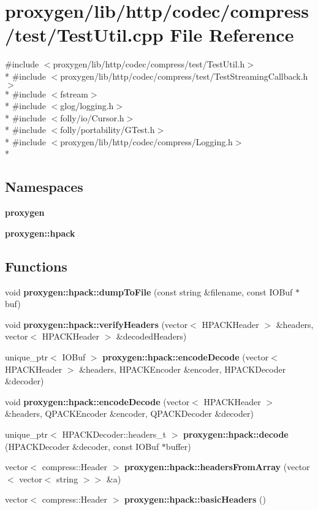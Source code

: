 \section{proxygen/lib/http/codec/compress/test/\+Test\+Util.cpp File Reference}
\label{TestUtil_8cpp}
{\ttfamily \#include $<$proxygen/lib/http/codec/compress/test/\+Test\+Util.\+h$>$}\\*
{\ttfamily \#include $<$proxygen/lib/http/codec/compress/test/\+Test\+Streaming\+Callback.\+h$>$}\\*
{\ttfamily \#include $<$fstream$>$}\\*
{\ttfamily \#include $<$glog/logging.\+h$>$}\\*
{\ttfamily \#include $<$folly/io/\+Cursor.\+h$>$}\\*
{\ttfamily \#include $<$folly/portability/\+G\+Test.\+h$>$}\\*
{\ttfamily \#include $<$proxygen/lib/http/codec/compress/\+Logging.\+h$>$}\\*
\subsection*{Namespaces}
\begin{DoxyCompactItemize}
\item 
 {\bf proxygen}
\item 
 {\bf proxygen\+::hpack}
\end{DoxyCompactItemize}
\subsection*{Functions}
\begin{DoxyCompactItemize}
\item 
void {\bf proxygen\+::hpack\+::dump\+To\+File} (const string \&filename, const I\+O\+Buf $\ast$buf)
\item 
void {\bf proxygen\+::hpack\+::verify\+Headers} (vector$<$ H\+P\+A\+C\+K\+Header $>$ \&headers, vector$<$ H\+P\+A\+C\+K\+Header $>$ \&decoded\+Headers)
\item 
unique\+\_\+ptr$<$ I\+O\+Buf $>$ {\bf proxygen\+::hpack\+::encode\+Decode} (vector$<$ H\+P\+A\+C\+K\+Header $>$ \&headers, H\+P\+A\+C\+K\+Encoder \&encoder, H\+P\+A\+C\+K\+Decoder \&decoder)
\item 
void {\bf proxygen\+::hpack\+::encode\+Decode} (vector$<$ H\+P\+A\+C\+K\+Header $>$ \&headers, Q\+P\+A\+C\+K\+Encoder \&encoder, Q\+P\+A\+C\+K\+Decoder \&decoder)
\item 
unique\+\_\+ptr$<$ H\+P\+A\+C\+K\+Decoder\+::headers\+\_\+t $>$ {\bf proxygen\+::hpack\+::decode} (H\+P\+A\+C\+K\+Decoder \&decoder, const I\+O\+Buf $\ast$buffer)
\item 
vector$<$ compress\+::\+Header $>$ {\bf proxygen\+::hpack\+::headers\+From\+Array} (vector$<$ vector$<$ string $>$$>$ \&a)
\item 
vector$<$ compress\+::\+Header $>$ {\bf proxygen\+::hpack\+::basic\+Headers} ()
\end{DoxyCompactItemize}
